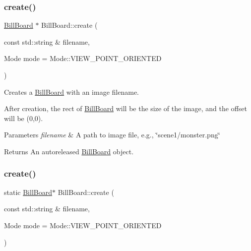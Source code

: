 \subsubsection{\texorpdfstring{create()}{create()}\hspace{0.1cm}{\footnotesize\ttfamily [3/6]}}
{\footnotesize\ttfamily \hyperlink{classBillBoard}{Bill\+Board} $\ast$ Bill\+Board\+::create (\begin{DoxyParamCaption}\item[{const std\+::string \&}]{filename,  }\item[{Mode}]{mode = {\ttfamily Mode\+:\+:VIEW\+\_\+POINT\+\_\+ORIENTED} }\end{DoxyParamCaption})\hspace{0.3cm}{\ttfamily [static]}}

Creates a \hyperlink{classBillBoard}{Bill\+Board} with an image filename.

After creation, the rect of \hyperlink{classBillBoard}{Bill\+Board} will be the size of the image, and the offset will be (0,0).


\begin{DoxyParams}{Parameters}
{\em filename} & A path to image file, e.\+g., \char`\"{}scene1/monster.\+png\char`\"{} \\
\hline
\end{DoxyParams}
\begin{DoxyReturn}{Returns}
An autoreleased \hyperlink{classBillBoard}{Bill\+Board} object. 
\end{DoxyReturn}
\mbox{\label{classBillBoard_af25f3d3e9241d7ea53ec4cc9568d0338}} 
\subsubsection{\texorpdfstring{create()}{create()}\hspace{0.1cm}{\footnotesize\ttfamily [4/6]}}
{\footnotesize\ttfamily static \hyperlink{classBillBoard}{Bill\+Board}$\ast$ Bill\+Board\+::create (\begin{DoxyParamCaption}\item[{const std\+::string \&}]{filename,  }\item[{Mode}]{mode = {\ttfamily Mode\+:\+:VIEW\+\_\+POINT\+\_\+ORIENTED} }\end{DoxyParamCaption})\hspace{0.3cm}{\ttfamily [static]}}

